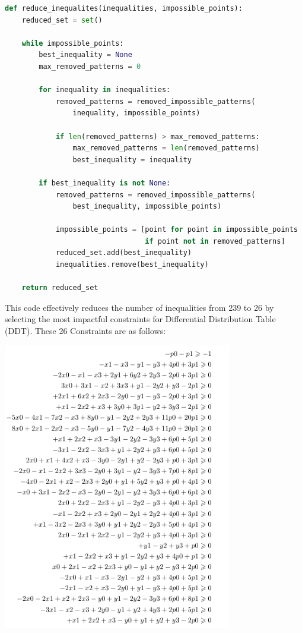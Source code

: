 \begin{lstlisting}[language=Python]
def reduce_inequalites(inequalities, impossible_points):
    reduced_set = set()

    while impossible_points:
        best_inequality = None
        max_removed_patterns = 0

        for inequality in inequalities:
            removed_patterns = removed_impossible_patterns(
                inequality, impossible_points)

            if len(removed_patterns) > max_removed_patterns:
                max_removed_patterns = len(removed_patterns)
                best_inequality = inequality

        if best_inequality is not None:
            removed_patterns = removed_impossible_patterns(
                best_inequality, impossible_points)

            impossible_points = [point for point in impossible_points 
                                 if point not in removed_patterns]
            reduced_set.add(best_inequality)
            inequalities.remove(best_inequality)

    return reduced_set
\end{lstlisting}

This code effectively reduces the number of inequalities from 239 to 26 by
selecting the most impactful constraints for Differential Distribution Table (DDT).
These 26 Constraints are as follows:
\begin{center}
    \includegraphics[width=10cm]{./images/sbox_equations.png}
\end{center}

